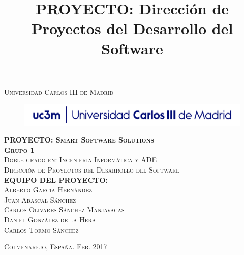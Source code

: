 \title{PROYECTO: Dirección de Proyectos del Desarrollo del Software} %

\begin{titlingpage}
\begin{center}

\textsc{\Large Universidad Carlos III de Madrid}\\[4em]

\begin{figure}[h]
\begin{center}
\includegraphics[width=1\textwidth]{uc3m.jpg}
\end{center}
\end{figure}

\vspace{4em}

\textsc{\huge \textbf{PROYECTO: Smart Software Solutions}}\\[4em]

\textsc{\large \textbf{Grupo 1}}\\[1em]

\textsc{Doble grado en: Ingeniería Informática y ADE}\\[1em]

\textsc{Dirección de Proyectos del Desarrollo del Software}\\[16em]

\textsc{\LARGE \textbf{EQUIPO DEL PROYECTO:}}\\[2em]
\textsc{\Large Alberto García Hernández}\\[1em]
\textsc{\Large Juan Abascal Sánchez}\\[1em]
\textsc{\Large Carlos Olivares Sánchez Manjavacas}\\[1em]
\textsc{\Large Daniel González de la Hera}\\[1em]
\textsc{\Large Carlos Tormo Sánchez}\\[1em]


\end{center}

\vspace*{\fill}
\textsc{Colmenarejo, España. \hspace*{\fill} Feb. 2017}


\end{titlingpage}
